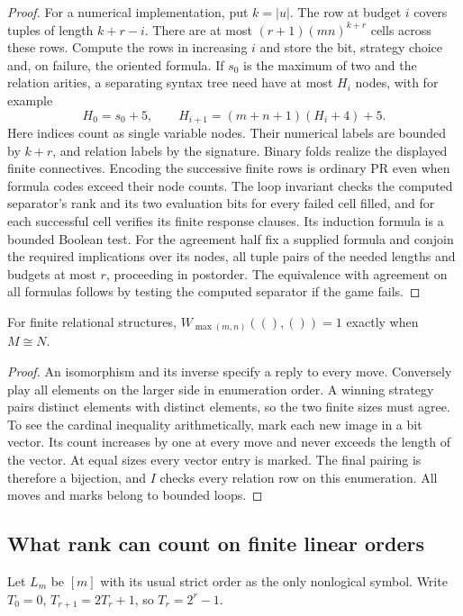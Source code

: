 \begin{proof}
For a numerical implementation, put $k=|u|$. The row at budget $i$ covers tuples of length $k+r-i$. There are at most $(r+1)(mn)^{k+r}$ cells across these rows. Compute the rows in increasing $i$ and store the bit, strategy choice and, on failure, the oriented formula. If $s_0$ is the maximum of two and the relation arities, a separating syntax tree need have at most $H_i$ nodes, with for example
\[
 H_0=s_0+5,\qquad H_{i+1}=(m+n+1)(H_i+4)+5 .
\]
Here indices count as single variable nodes. Their numerical labels are bounded by $k+r$, and relation labels by the signature. Binary folds realize the displayed finite connectives. Encoding the successive finite rows is ordinary PR even when formula codes exceed their node counts. The loop invariant checks the computed separator's rank and its two evaluation bits for every failed cell filled, and for each successful cell verifies its finite response clauses. Its induction formula is a bounded Boolean test. For the agreement half fix a supplied formula and conjoin the required implications over its nodes, all tuple pairs of the needed lengths and budgets at most $r$, proceeding in postorder. The equivalence with agreement on all formulas follows by testing the computed separator if the game fails.
\end{proof}

\begin{corollary}
For finite relational structures, $W_{\max(m,n)}((),())=1$ exactly when $M\cong N$.
\end{corollary}
\begin{proof}
An isomorphism and its inverse specify a reply to every move. Conversely play all elements on the larger side in enumeration order. A winning strategy pairs distinct elements with distinct elements, so the two finite sizes must agree. To see the cardinal inequality arithmetically, mark each new image in a bit vector. Its count increases by one at every move and never exceeds the length of the vector. At equal sizes every vector entry is marked. The final pairing is therefore a bijection, and $I$ checks every relation row on this enumeration. All moves and marks belong to bounded loops.
\end{proof}

\subsection{What rank can count on finite linear orders}
Let $L_m$ be $[m]$ with its usual strict order as the only nonlogical symbol. Write $T_0=0$, $T_{r+1}=2T_r+1$, so $T_r=2^r-1$.

